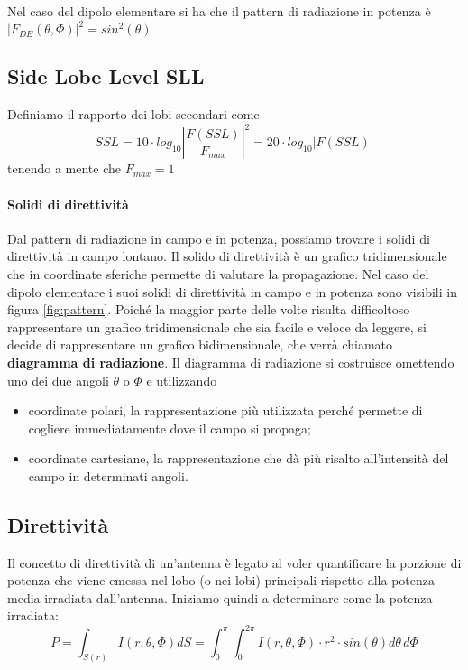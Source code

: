 Nel caso del dipolo elementare si ha che il pattern di radiazione in potenza è
$|  F_{DE}(\theta,\Phi)|^2 = sin^2(\theta)$

\subsection{Side Lobe Level SLL}
Definiamo il rapporto dei lobi secondari come
\begin{equation}\label{eq:SLL}
  SSL=10 \cdot log_{10}\left|\frac{F(SSL)}{F_{max}}\right|^2 = 20 \cdot log_{10} |F(SSL)|
\end{equation}
tenendo a mente che $F_{max}=1$

\paragraph{Solidi di direttività}
Dal pattern di radiazione in campo e in potenza, possiamo trovare i solidi di direttività in campo lontano. Il solido di direttività è un grafico tridimensionale che in coordinate sferiche permette di valutare la propagazione. Nel caso del dipolo elementare i suoi solidi di direttività in campo e in potenza sono visibili in figura \ref{fig:pattern}.
Poiché la maggior parte delle volte risulta difficoltoso rappresentare un grafico tridimensionale che sia facile e veloce da leggere, si decide di rappresentare un grafico bidimensionale, che verrà chiamato \textbf{diagramma di radiazione}.
Il diagramma di radiazione si costruisce omettendo uno dei due angoli $\theta$ o $\Phi$ e utilizzando
\begin{itemize}
  \item coordinate polari, la rappresentazione più utilizzata perché permette di cogliere immediatamente dove il campo si propaga;
  \item coordinate cartesiane, la rappresentazione che dà più risalto all'intensità del campo in determinati angoli.
\end{itemize}

\subsection{Direttività}
Il concetto di direttività di un'antenna è legato al voler quantificare la porzione di potenza che viene emessa nel lobo (o nei lobi) principali rispetto alla potenza media irradiata dall'antenna.
Iniziamo quindi a determinare come la potenza irradiata:
\begin{equation}
  P= \int_{S(r)} I(r,\theta,\Phi) dS =\int_0^\pi\int_0^{2\pi} I(r,\theta,\Phi)\cdot r^2 \cdot sin(\theta)d\theta\,d\Phi
\end{equation}

